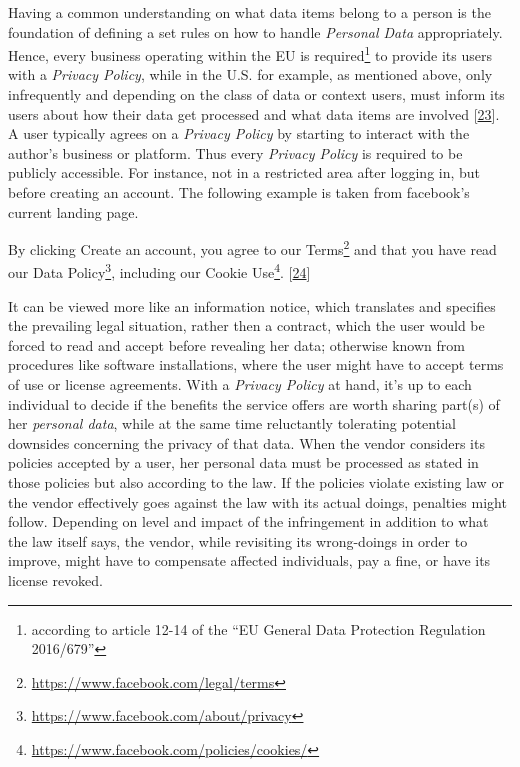 \documentclass[12pt,english,a4paper,titlepage,cleardoublepage=empty,dottedtoc]{report}
\renewcommand{\href}[2]{#2\footnote{\url{#1}}}
\let\origquote\quote
\let\endorigquote\endquote
\renewenvironment{quote}{%
    \origquote
    \itshape
}
{\endorigquote}
\begin{document}
Having a common understanding on what data items belong to a person is
the foundation of defining a set rules on how to handle \emph{Personal
Data} appropriately. Hence, every business operating within the EU is
required\footnote{according to article 12-14 of the ``EU General Data
  Protection Regulation 2016/679''} to provide its users with a
\emph{Privacy Policy}, while in the U.S. for example, as mentioned
above, only infrequently and depending on the class of data or context
users, must inform its users about how their data get processed and what
data items are involved
{[}\protect\hyperlink{ref-web_2016_privacy-policies-are-mandatory-by-law}{23}{]}.
A user typically agrees on a \emph{Privacy Policy} by starting to
interact with the author's business or platform. Thus every
\emph{Privacy Policy} is required to be publicly accessible. For
instance, not in a restricted area after logging in, but before creating
an account. The following example is taken from facebook's current
landing page.

\begin{quote}
By clicking Create an account, you agree to our
\href{https://www.facebook.com/legal/terms}{Terms} and that you have
read our \href{https://www.facebook.com/about/privacy}{Data Policy},
including our \href{https://www.facebook.com/policies/cookies/}{Cookie
Use}.
{[}\protect\hyperlink{ref-web_2016_facebooks-landing-page_policy-acknowledgement}{24}{]}
\end{quote}

It can be viewed more like an information notice, which translates and
specifies the prevailing legal situation, rather then a contract, which
the user would be forced to read and accept before revealing her data;
otherwise known from procedures like software installations, where the
user might have to accept terms of use or license agreements. With a
\emph{Privacy Policy} at hand, it's up to each individual to decide if
the benefits the service offers are worth sharing part(s) of her
\emph{personal data}, while at the same time reluctantly tolerating
potential downsides concerning the privacy of that data. When the vendor
considers its policies accepted by a user, her personal data must be
processed as stated in those policies but also according to the law. If
the policies violate existing law or the vendor effectively goes against
the law with its actual doings, penalties might follow. Depending on
level and impact of the infringement in addition to what the law itself
says, the vendor, while revisiting its wrong-doings in order to improve,
might have to compensate affected individuals, pay a fine, or have its
license revoked.
\end{document}
